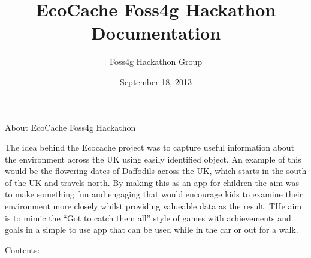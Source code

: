\documentclass[letterpaper,10pt,english]{sphinxmanual}
\title{EcoCache Foss4g Hackathon Documentation}
\date{September 18, 2013}
\author{Foss4g Hackathon Group}
\begin{document}
\maketitle
\tableofcontents
{}\label{index::doc}


About EcoCache Foss4g Hackathon

The idea behind the Ecocache project was to capture useful information about the environment across the UK using easily identified object.
An example of this would be the flowering dates of Daffodils across the UK, which starts in the south of the UK and travels north.
By making this as an app for children the aim was to make something fun and engaging that would encourage kids to examine their
environment more closely whilst providing valueable data as the result.
THe aim is to mimic the ``Got to catch them all'' style of games with achievements and goals in a simple to use app that can be used
while in the car or out for a walk.

Contents:
\end{document}

